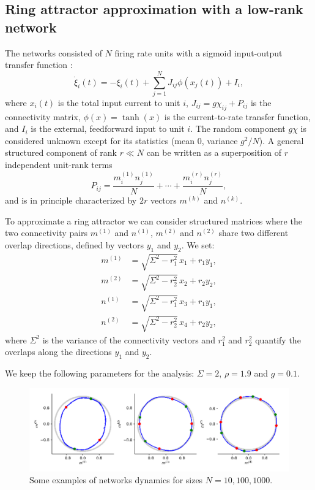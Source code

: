 \documentclass{article} %
\newcounter{ct}
\theoremstyle{definition}
\theoremstyle{remark}
\begin{document}
\subsection{Ring attractor approximation with a low-rank network}\label{sec:supp:lowrank}
The networks consisted of \(N\) firing rate units with a sigmoid input-output transfer function \citep{mastrogiuseppe2018}:
\begin{equation}
\dot \xi_{i}(t) = - \xi_{i}(t) + \sum_{j = 1}^{N} J_{ij}\phi(x_{j}(t)) + I_{i},
\label{eq:1}
\end{equation}where \(x_{i}(t)\) is the total input current to unit \(i\),
\( J_{ij} = g\chi_{ij} + P_{ij}\) is the connectivity matrix,
\(\phi(x) = \tanh(x)\) is the current-to-rate transfer function, and \(I_{i}\) is the external, feedforward input to unit \(i\).
The random component \(g\chi\) is considered unknown except for its statistics (mean 0, variance \(g^{2}/N\)).
A general structured component of rank \(r\ll N\) can be written as a superposition of \(r\) independent unit-rank terms
\begin{equation}
P_{ij} = \frac{m_{i}^{(1)} n_{j}^{(1)}}{N} + \cdots + \frac{m_{i}^{(r)} n_{j}^{(r)}}{N},
\end{equation} and is in principle characterized by \(2r\) vectors \(m^{(k)}\) and \(n^{(k)}\).

To approximate a ring attractor we can consider structured matrices where the two connectivity pairs \( m^{(1)} \) and \( n^{(1)} \), \( m^{(2)} \) and \( n^{(2)} \) share two different overlap directions, defined by vectors \( y_{1} \) and \( y_{2} \). We set:
\begin{align}
    m^{(1)} &= \sqrt{\Sigma^{2} - r_{1}^{2}} \, x_{1} + r_{1} y_{1}, \\
    m^{(2)} &= \sqrt{\Sigma^{2} - r_{2}^{2}} \, x_{2} + r_{2} y_{2}, \\
    n^{(1)} &= \sqrt{\Sigma^{2} - r_{1}^{2}} \, x_{3} + r_{1} y_{1}, \\
    n^{(2)} &= \sqrt{\Sigma^{2} - r_{2}^{2}} \, x_{4} + r_{2} y_{2},
\end{align}
where \( \Sigma^{2} \) is the variance of the connectivity vectors and \( r_{1}^{2} \) and \( r_{2}^{2} \) quantify the overlaps along the directions \( y_{1} \) and \( y_{2} \).

We keep the following parameters for the analysis:
\(\Sigma = 2\),
\(\rho = 1.9\) and
\(g=0.1\).


\begin{figure}[h]
\centering
\includegraphics[width=\textwidth]{N100_si2_rho1.9_g0_fp4.8.12_s}
\caption{Some examples of networks dynamics for sizes \(N = 10, 100, 1000\).}\label{fig:low_rank_examples}
\end{figure}
\end{document}
